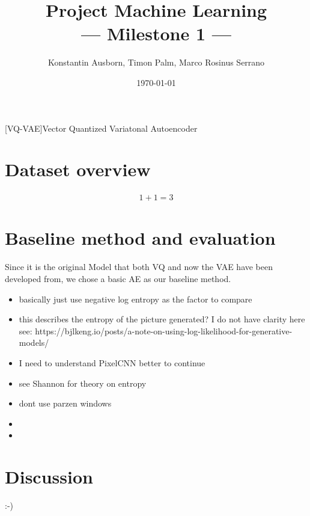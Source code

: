 \documentclass[10pt,a4paper,twoside]{article}
\title{Project Machine Learning\\--- Milestone 1 ---}
\author{Konstantin Ausborn, Timon Palm, Marco Rosinus Serrano}
\date{\today}
\begin{document}
[VQ-VAE]{Vector Quantized Variatonal Autoencoder}

\maketitle

\section{Dataset overview}
    \begin{align}
        1 + 1 = 3
    \end{align}

\section{Baseline method and evaluation}\label{sec:baseline-method-and-evaluation}
Since it is the original Model that both \ac{VQ} and now the \ac{VAE} have been developed from,
we chose a basic \ac{AE} as our baseline method.

\begin{itemize}
    \item basically just use negative log entropy as the factor to compare
    \item this describes the entropy of the picture generated?
    I do not have clarity here see: https://bjlkeng.io/posts/a-note-on-using-log-likelihood-for-generative-models/
    \item I need to understand PixelCNN better to continue
    \item see Shannon for theory on entropy\cite{shannon}
    \item dont use parzen windows\cite{note_on_eval}
    \item
    \item
\end{itemize}

\section{Discussion}
:-)


\end{document}
